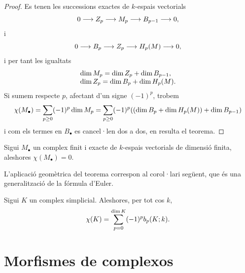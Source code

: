 \documentclass[../main.tex]{subfiles}
\begin{document}
\begin{proof}
Es tenen les successions exactes de $k$-espais vectorials
\begin{equation}
    \notag
    0\longrightarrow Z_p\longrightarrow M_p\longrightarrow B_{p-1}\longrightarrow 0,
\end{equation}
i
\begin{equation}
    \notag
    0\longrightarrow B_p\longrightarrow Z_p\longrightarrow H_p(M)\longrightarrow 0,
\end{equation}
i per tant les igualtats
\begin{equation}
    \notag
    \begin{array}{ll}
        \dim M_p = \dim Z_p + \dim B_{p-1},\\
        \dim Z_p = \dim B_p+\dim H_p(M).
    \end{array}
\end{equation}  
Si sumem respecte $p$, afectant d'un signe $(-1)^p$, trobem
\begin{equation}
    \notag
    \chi(M_\bullet) = \sum_{p\geq 0}(-1)^p\dim M_p = \sum_{p\geq 0}(-1)^p((\dim B_p+\dim H_p(M))+\dim B_{p-1})
\end{equation}
i com els termes en $B_\bullet$ es cancel·len dos a dos, en resulta el teorema.
\end{proof}

\begin{coro}
Sigui $M_\bullet$ un complex finit i exacte de $k$-espais vectorials de dimensió finita, aleshores $\chi(M_\bullet) = 0$.
\end{coro}

L'aplicació geomètrica del teorema correspon al corol·lari següent, que és una generalització de la fórmula d'Euler.

\begin{coro}
 Sigui $K$ un complex simplicial. Aleshores, per tot cos $k$, 
 \begin{equation}
     \notag
     \chi(K) = \sum_{p=0}^{\dim K}(-1)^p b_p(K;k).
 \end{equation}
\end{coro}





\section{Morfismes de complexos}
\end{document}
